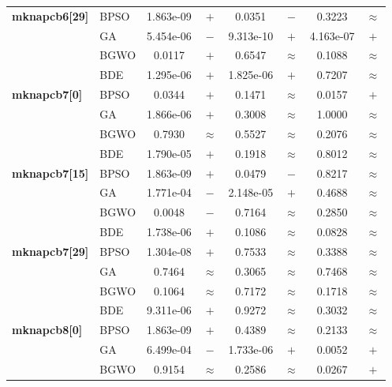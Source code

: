 \begin{table}[htbp]
\begin{tabular*}{\textwidth}{@{\extracolsep{\fill}}llcccccc@{}}
    \midrule
    \textbf{mknapcb6[29]} & BPSO  & 1.863e-09 & $+$ &    0.0351 & $-$ &    0.3223 & $\approx$ \\
                       & GA    & 5.454e-06 & $-$ & 9.313e-10 & $+$ & 4.163e-07 & $+$ \\
                       & BGWO  &    0.0117 & $+$ &    0.6547 & $\approx$ &    0.1088 & $\approx$ \\
                       & BDE   & 1.295e-06 & $+$ & 1.825e-06 & $+$ &    0.7207 & $\approx$ \\
    \midrule
    \textbf{mknapcb7[0]} & BPSO  &    0.0344 & $+$ &    0.1471 & $\approx$ &    0.0157 & $+$ \\
                       & GA    & 1.866e-06 & $+$ &    0.3008 & $\approx$ &    1.0000 & $\approx$ \\
                       & BGWO  &    0.7930 & $\approx$ &    0.5527 & $\approx$ &    0.2076 & $\approx$ \\
                       & BDE   & 1.790e-05 & $+$ &    0.1918 & $\approx$ &    0.8012 & $\approx$ \\
    \midrule
    \textbf{mknapcb7[15]} & BPSO  & 1.863e-09 & $+$ &    0.0479 & $-$ &    0.8217 & $\approx$ \\
                       & GA    & 1.771e-04 & $-$ & 2.148e-05 & $+$ &    0.4688 & $\approx$ \\
                       & BGWO  &    0.0048 & $-$ &    0.7164 & $\approx$ &    0.2850 & $\approx$ \\
                       & BDE   & 1.738e-06 & $+$ &    0.1086 & $\approx$ &    0.0828 & $\approx$ \\
    \midrule
    \textbf{mknapcb7[29]} & BPSO  & 1.304e-08 & $+$ &    0.7533 & $\approx$ &    0.3388 & $\approx$ \\
                       & GA    &    0.7464 & $\approx$ &    0.3065 & $\approx$ &    0.7468 & $\approx$ \\
                       & BGWO  &    0.1064 & $\approx$ &    0.7172 & $\approx$ &    0.1718 & $\approx$ \\
                       & BDE   & 9.311e-06 & $+$ &    0.9272 & $\approx$ &    0.3032 & $\approx$ \\
    \midrule
    \textbf{mknapcb8[0]} & BPSO  & 1.863e-09 & $+$ &    0.4389 & $\approx$ &    0.2133 & $\approx$ \\
                       & GA    & 6.499e-04 & $-$ & 1.733e-06 & $+$ &    0.0052 & $+$ \\
                       & BGWO  &    0.9154 & $\approx$ &    0.2586 & $\approx$ &    0.0267 & $+$ \\

\end{tabular*}
\end{table}
